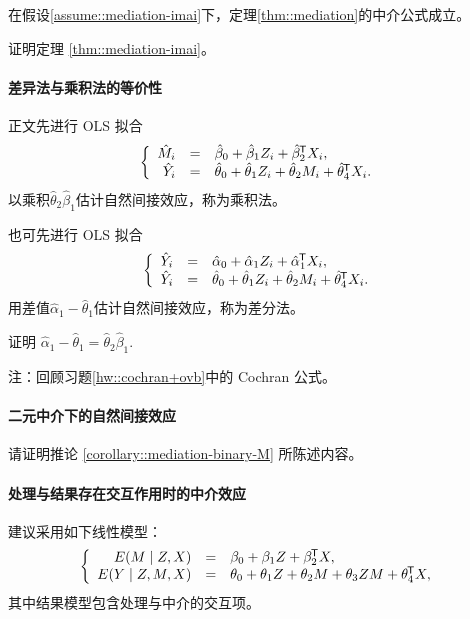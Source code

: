 \begin{theorem}
\label{thm::mediation-imai}
在假设\ref{assume::mediation-imai}下，定理\ref{thm::mediation}的中介公式成立。 
\end{theorem}


证明定理 \ref{thm::mediation-imai}。 



\paragraph{差异法与乘积法的等价性}\label{hw::difference=product}


正文先进行 OLS 拟合
$$
\left\{\begin{array}{rcl}
\hat M_i &=&  \hat\beta_0 + \hat\beta_1 Z_i + \hat\beta_2^{\mkern-1.5mu\mathsf{T}} X_i, \\
\hat Y_i &=&\hat \theta_0 + \hat\theta_1 Z_i +\hat \theta_2 M_i + \hat\theta_4^{\mkern-1.5mu\mathsf{T}} X_i.
\end{array}\right.
$$
以乘积$\hat \theta_2 \hat\beta_1 $估计自然间接效应，称为乘积法。 

也可先进行 OLS 拟合
$$
\left\{\begin{array}{rcl}
\hat Y_i &=&  \hat\alpha_0 + \hat\alpha_1 Z_i + \hat\alpha_1 ^{\mkern-1.5mu\mathsf{T}} X_i, \\
\hat Y_i &=&\hat \theta_0 + \hat\theta_1 Z_i +\hat \theta_2 M_i + \hat\theta_4^{\mkern-1.5mu\mathsf{T}} X_i.
\end{array}\right.
$$
用差值$\hat\alpha_1 -  \hat\theta_1$估计自然间接效应，称为差分法。 

证明 $\hat\alpha_1 -  \hat\theta_1 = \hat \theta_2 \hat\beta_1 .$


注：回顾习题\ref{hw::cochran+ovb}中的 Cochran 公式。 



\paragraph{二元中介下的自然间接效应}\label{para::nie-binary-m}

请证明推论 \ref{corollary::mediation-binary-M} 所陈述内容。 


\paragraph{处理与结果存在交互作用时的中介效应}\label{para::interaction}
\citet{vanderweele2015explanation}建议采用如下线性模型：
$$
\left\{\begin{array}{rcl}
E(M \mid Z, X) &=&  \beta_0 + \beta_1 Z + \beta_2^{\mkern-1.5mu\mathsf{T}} X, \\
E(Y\mid Z,M,X) &=& \theta_0 + \theta_1 Z + \theta_2 M + \theta_3 ZM + \theta_4^{\mkern-1.5mu\mathsf{T}} X,
\end{array}\right.
$$
其中结果模型包含处理与中介的交互项。 


